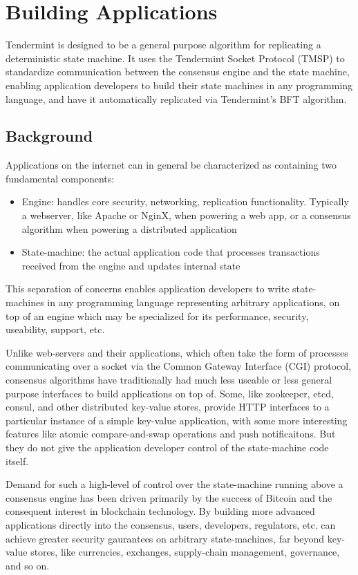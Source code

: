 \chapter{Building Applications}
\label{ch:apps}

Tendermint is designed to be a general purpose algorithm for replicating a deterministic state machine.
It uses the Tendermint Socket Protocol (TMSP) to standardize communication between the consensus engine and the state machine,
enabling application developers to build their state machines in any programming language, 
and have it automatically replicated via Tendermint's BFT algorithm.

\section{Background}

Applications on the internet can in general be characterized as containing two fundamental components:

\begin{itemize}
\item{Engine: handles core security, networking, replication functionality. Typically a webserver, like Apache or NginX, when powering a web app, or a consensus algorithm when powering a distributed application}
\item{State-machine: the actual application code that processes transactions received from the engine  and updates internal state}
\end{itemize}

This separation of concerns enables application developers to write state-machines in any programming language representing arbitrary applications,
on top of an engine which may be specialized for its performance, security, useability, support, etc.

Unlike web-servers and their applications, which often take the form of processes communicating over a socket via the Common Gateway Interface (CGI) protocol,
consensus algorithms have traditionally had much less useable or less general purpose interfaces to build applications on top of.
Some, like zookeeper, etcd, consul, and other distributed key-value stores, 
provide HTTP interfaces to a particular instance of a simple key-value application, 
with some more interesting features like atomic compare-and-swap operations and push notificaitons.
But they do not give the application developer control of the state-machine code itself.

Demand for such a high-level of control over the state-machine running above a consensus engine has been driven primarily by the success of Bitcoin and the consequent interest in blockchain technology.
By building more advanced applications directly into the consensus, 
users, developers, regulators, etc. can achieve greater security gaurantees on arbitrary state-machines, 
far beyond key-value stores, like currencies, exchanges, supply-chain management, governance, and so on.

